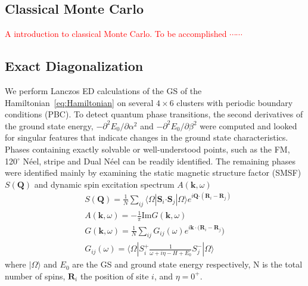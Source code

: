 \documentclass[aps,prb,reprint,amsfonts,amsmath,amssymb,showpacs,groupedaddress,superscriptaddress]{revtex4-1}
\begin{document}
\subsection{\label{sec:SectionIIA}Classical Monte Carlo}
\textcolor{red}{A introduction to classical Monte Carlo. To be accomplished $\cdots \cdots$}

\subsection{\label{sec:SectionIIB}Exact Diagonalization}
We perform Lanczos ED calculations of the GS of the Hamiltonian~\eqref{eq:Hamiltonian} on several $4 \times 6$ clusters with periodic boundary conditions (PBC). To detect quantum phase transitions, the second derivatives of the ground state energy, $-\partial^2E_0/\partial\alpha^2$ and $-\partial^2E_0/\partial\beta^2$ were computed and looked for singular features that indicate changes in the ground state characteristics. Phases containing exactly solvable or well-understood points, such as the FM, 120$^\circ$ N\'{e}el, stripe and Dual N\'{e}el can be readily identified. The remaining phases were identified mainly by examining the static magnetic structure factor (SMSF) $S(\bm{Q})$ and dynamic spin excitation spectrum $A(\bm{k}, \omega)$
\begin{subequations}
    \begin{align}
        & S(\bm{Q}) = \frac{1}{N} \sum_{ij} \langle \Omega | \bm{S}_i \bm{\cdot} \bm{S}_j | \Omega \rangle e^{i \bm{Q} \bm{\cdot} (\bm{R}_i - \bm{R}_j)} \label{eq:SMSF} \\
        & A(\bm{k}, \omega) = -\frac{1}{\pi} \text{Im} G(\bm{k}, \omega) \label{eq:Akomega} \\
        & G(\bm{k}, \omega) = \frac{1}{N} \sum_{ij} G_{ij}(\omega) e^{i \bm{k} \cdot (\bm{R}_i - \bm{R}_j}) \\
        & G_{ij}(\omega) = \langle \Omega | S_i^{+} \frac{1}{\omega + i\eta - H + E_0} S_j^{-} | \Omega \rangle
    \end{align}
\end{subequations}
where $| \Omega \rangle$ and $E_0$ are the GS and ground state energy respectively, N is the total number of spins, $\bm{R}_i$ the position of site $i$, and $\eta = 0^+$.
\end{document}
